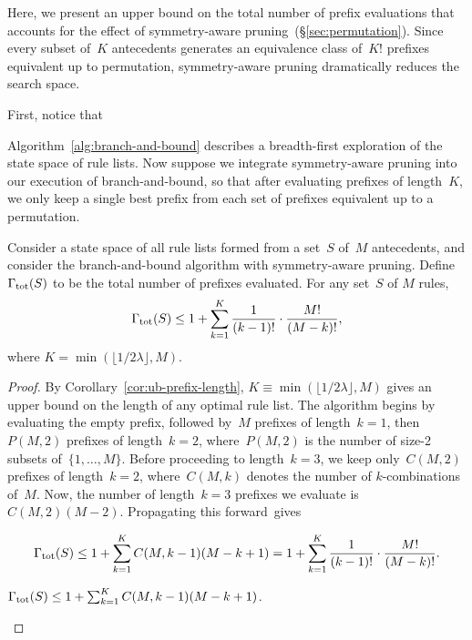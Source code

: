 \documentclass[twoside,11pt]{article}
\def\Reg{{\lambda}}
\def\RuleSet{S}
\def\TotalRemaining{{\Gamma_{\textnormal{tot}}}}
\newcommand{\nn}{\nonumber}
\begin{document}
Here, we present an upper bound on the total number of prefix
evaluations that accounts for the effect of symmetry-aware
pruning~(\S\ref{sec:permutation}).
%
Since every subset of~$K$ antecedents generates an equivalence
class of~$K!$ prefixes equivalent up to permutation, symmetry-aware
pruning dramatically reduces the search space.

\begin{arxiv}
First, notice that
\end{arxiv}
Algorithm~\ref{alg:branch-and-bound} describes a
breadth-first exploration of the state space of rule lists.
%
Now suppose we integrate symmetry-aware pruning into
our execution of branch-and-bound, so that after evaluating
prefixes of length~$K$, we only keep a single best prefix
from each set of prefixes equivalent up to a permutation.

\begin{theorem}[\fontdimen2\font=0.6ex Upper bound on prefix evaluations with symmetry-aware pruning]
%
Consider a state space of all rule lists formed from a set~$\RuleSet$
of~$M$ antecedents, and consider the branch-and-bound algorithm with
symmetry-aware pruning.
%
Define $\TotalRemaining(\RuleSet)$ to be the total number of prefixes evaluated.
%
For any set~$\RuleSet$ of $M$ rules,
\begin{align}
\TotalRemaining(\RuleSet)
\le  1 + \sum_{k=1}^K \frac{1}{(k - 1)!} \cdot \frac{M!}{(M - k)!}, \nn
\end{align}
where ${K = \min(\lfloor 1 / 2 \Reg \rfloor, M)}$.
\end{theorem}

\begin{proof}
By Corollary~\ref{cor:ub-prefix-length},
${K \equiv \min(\lfloor 1 / 2 \Reg \rfloor, M)}$
gives an upper bound on the length of any optimal rule list.
%
The algorithm begins by evaluating the empty prefix,
followed by~$M$ prefixes of length~${k=1}$,
then~${P(M, 2)}$ prefixes of length~${k=2}$,
where~${P(M, 2)}$ is the number of size-2 subsets of~$\{1, \dots, M \}$.
%
Before proceeding to length~${k=3}$, we keep only~${C(M, 2)}$
prefixes of length~${k=2}$, where~${C(M, k)}$ denotes the
number of $k$-combinations of~$M$.
%
Now, the number of length~${k=3}$ prefixes we evaluate is~${C(M, 2) (M - 2)}$.
%
Propagating this forward~gives
\begin{arxiv}
\begin{align}
\TotalRemaining(\RuleSet) \le 1 + \sum_{k=1}^K C(M, k-1) (M - k + 1)
= 1 + \sum_{k=1}^K \frac{1}{(k - 1)!} \cdot \frac{M!}{(M - k)!}. \nn
\end{align}
\end{arxiv}
\begin{kdd}
${\TotalRemaining(\RuleSet) \le 1 + \sum_{k=1}^K C(M, k-1) (M - k + 1)}$.
\end{kdd}
\end{proof}
\end{document}

